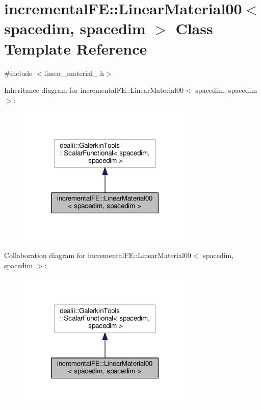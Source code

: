\hypertarget{classincremental_f_e_1_1_linear_material00_3_01spacedim_00_01spacedim_01_4}{}\section{incremental\+FE\+:\+:Linear\+Material00$<$ spacedim, spacedim $>$ Class Template Reference}
\label{classincremental_f_e_1_1_linear_material00_3_01spacedim_00_01spacedim_01_4}


{\ttfamily \#include $<$linear\+\_\+material\+\_.\+h$>$}



Inheritance diagram for incremental\+FE\+:\+:Linear\+Material00$<$ spacedim, spacedim $>$\+:\nopagebreak
\begin{figure}[H]
\begin{center}
\leavevmode
\includegraphics[width=237pt]{classincremental_f_e_1_1_linear_material00_3_01spacedim_00_01spacedim_01_4__inherit__graph}
\end{center}
\end{figure}


Collaboration diagram for incremental\+FE\+:\+:Linear\+Material00$<$ spacedim, spacedim $>$\+:\nopagebreak
\begin{figure}[H]
\begin{center}
\leavevmode
\includegraphics[width=237pt]{classincremental_f_e_1_1_linear_material00_3_01spacedim_00_01spacedim_01_4__coll__graph}
\end{center}
\end{figure}
